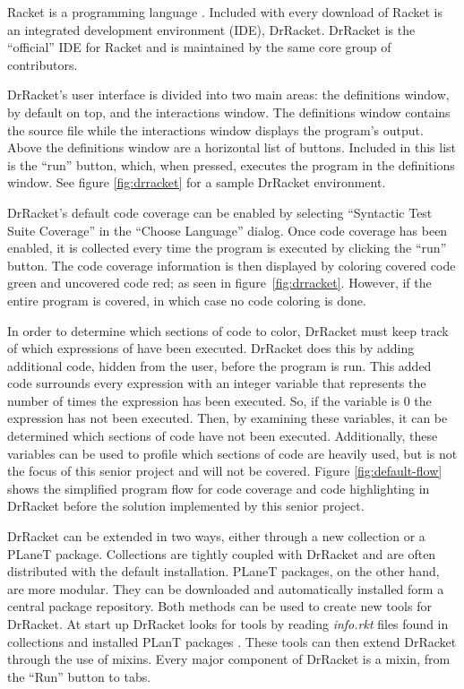 Racket is a programming language \cite{racket}. Included with every download of Racket is an integrated development environment (IDE), DrRacket. DrRacket is the ``official'' IDE for Racket and is maintained by the same core group of contributors. 

DrRacket's user interface is divided into two main areas: the definitions window, by default on top, and the interactions window. The definitions window contains the source file while the interactions window displays the program's output. Above the definitions window are a horizontal list of buttons. Included in this list is the ``run'' button, which, when pressed, executes the program in the definitions window. See figure \ref{fig:drracket} for a sample DrRacket environment.


DrRacket's default code coverage can be enabled by selecting ``Syntactic Test Suite Coverage'' in the ``Choose Language'' dialog. Once code coverage has been enabled, it is collected every time the program is executed by clicking the ``run'' button. The code coverage information is then displayed by coloring covered code green and uncovered code red; as seen in figure~\ref{fig:drracket}. However, if the entire program is covered, in which case no code coloring is done.

In order to determine which sections of code to color, DrRacket must keep track of which expressions of have been executed. DrRacket does this by adding additional code, hidden from the user, before the program is run. This added code surrounds every expression with an integer variable that represents the number of times the expression has been executed. So, if the variable is 0 the expression has not been executed. Then, by examining these variables, it can be determined which sections of code have not been executed. Additionally, these variables can be used to profile which sections of code are heavily used, but is not the focus of this senior project and will not be covered. Figure \ref{fig:default-flow} shows the simplified program flow for code coverage and code highlighting in DrRacket before the solution implemented by this senior project.


DrRacket can be extended in two ways, either through a new collection or a PLaneT package. Collections are tightly coupled with DrRacket and are often distributed with the default installation. PLaneT packages, on the other hand, are more modular. They can be downloaded and automatically installed form a central package repository. Both methods can be used to create new tools for DrRacket. At start up DrRacket looks for tools by reading \emph{info.rkt} files found in collections and installed PLanT packages \cite{plugin}. These tools can then extend DrRacket through the use of mixins. Every major component of DrRacket is a mixin, from the ``Run'' button to tabs. 
